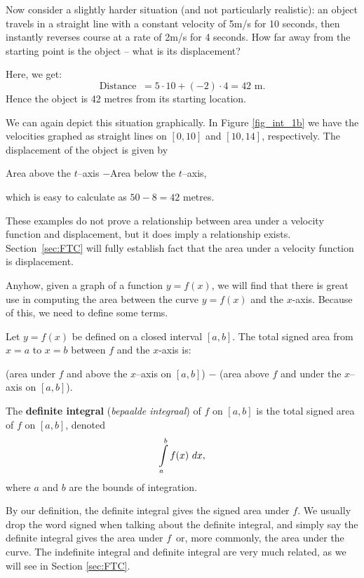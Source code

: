 Now consider a slightly harder situation (and not particularly realistic): an object travels in a straight line with a constant velocity of 5m/s for 10 seconds, then instantly reverses course at a rate of 2m/s for 4 seconds.  How far away from the starting point is the object -- what is its displacement?

Here, we get:
	$$\text{Distance } \ = 5\cdot10 + (-2)\cdot 4 = 42\text{ m.}$$ 
Hence the object is 42 metres from its starting location.

\ifanalysis\pagebreak\fi
We can again depict this situation graphically. In Figure \ref{fig_int_1b} we have the velocities graphed as straight lines on $[0,10]$ and $[10,14]$, respectively. The displacement of the object is given by  
		\begin{center}Area above the $t$--axis \quad $-$\quad Area below the $t$--axis,
		\end{center}
which is easy to calculate as $50-8=42$ metres.

These examples do not prove a relationship between area under a velocity function and displacement, but it does imply a relationship exists. Section~\ref{sec:FTC} will fully establish fact that the area under a velocity function is displacement.


Anyhow, given a graph of a function $y=f(x)$, we will find that there is great use in computing the area between the curve $y=f(x)$ and the $x$-axis. Because of this, we need to define some terms.

\begin{definition}\label{def:def_int}
Let $y=f(x)$ be defined on a closed interval $[a,b]$. The total signed area from $x=a$ to $x=b$ between $f$ and the $x$-axis  is:

\centering (area  under $f$ and above the $x$--axis on $[a,b]$) $-$ (area above $f$ and under the $x$--axis on $[a,b]$).\\
\vspace{0.25cm}
\raggedright
The \textbf{definite integral} (\textit{bepaalde integraal}) of $f$ on $[a,b]$ is the total signed area of $f$ on $[a,b]$, denoted $$\ds\int\limits_a^b f(x)\ dx,$$
where $a$ and $b$ are the bounds of integration.
\end{definition}

By our definition, the definite integral gives the signed area under $f$. We usually drop the word signed when talking about the definite integral, and simply say the definite integral gives the area under $f$\, or, more commonly, the area under the curve. The indefinite integral and definite integral are very much related, as we will see in Section \ref{sec:FTC}. 


